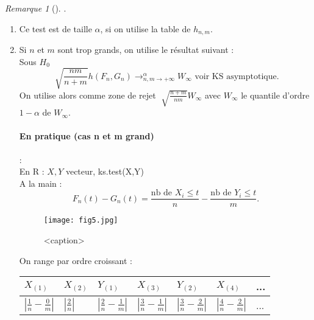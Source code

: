 \documentclass{article}
\theoremstyle{plain}%
\theoremstyle{definition}
\theoremstyle{remark}
\newtheorem*{rem}{Remarque}
\begin{document}
\begin{rem}[].
    \begin{enumerate}
        \item Ce test est de taille $ \alpha  $, si on utilise la table de $ h_{n,m} $.
        \item Si $ n $ et $ m $ sont trop grands, on utilise le résultat suivant : \\
            Sous $ H_0 $ 
            \[
                \sqrt[]{\frac{nm}{n+m}}h(F_n, G_n) \to ^{\alpha }_{n,m \to +\infty } W_\infty \text{ voir KS asymptotique}
            .\]
            On utilise alors comme zone de rejet $ \sqrt[]{\frac{n+m}{nm}}W_\infty  $ avec $ W_\infty  $ le quantile d'ordre $ 1 - \alpha  $ de $ W_\infty  $.

            \paragraph{En pratique (cas n et m grand)} : \\ 
            En R : $ X,Y $ vecteur, ks.test(X,Y) \\
            A la main : 
            \[
                F_n(t) - G_n(t) = \frac{\text{nb de } X_i \leq t}{n} - \frac{\text{nb de } Y_i \leq t}{m}
            .\]

            \begin{figure}[!htb]
                \centering
                \texttt{[image: fig5.jpg]}
                \caption{<caption>}
                \label{<label>}
            \end{figure}
            
            On range par ordre croissant : 

            \begin{table}[!h]
                \centering
                \begin{tabular}{|l|l|l|l|l|l|l|}
                \hline
                    $ X_{(1)} $ & $ X_{(2)} $ & $ Y_{(1)} $ & $ X_{(3)} $ & $ Y_{(2)} $ & $ X_{(4)} $ & ... \\ \hline
                    $ \left| \frac{1}{n} - \frac{0}{m} \right|  $  & $ \left| \frac{2}{n} \right| $  & $ \left| \frac{2}{n} - \frac{1}{m} \right|  $  & $ \left| \frac{3}{n} - \frac{1}{m} \right|  $ & $ \left| \frac{3}{n} - \frac{2}{m} \right|  $ & $ \left| \frac{4}{n} - \frac{2}{m}\right|  $ & ... \\ \hline
                \end{tabular}
            \end{table}


\end{enumerate}
\end{rem}
\end{document}

